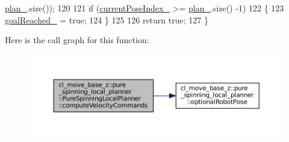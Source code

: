 \begin{DoxyCode}
      \hyperlink{classcl__move__base__z_1_1pure__spinning__local__planner_1_1PureSpinningLocalPlanner_a31875ee78bae4698b579e20c0754860d}{plan\_}.size());
120 
121   \textcolor{keywordflow}{if} (\hyperlink{classcl__move__base__z_1_1pure__spinning__local__planner_1_1PureSpinningLocalPlanner_aa0f9b4cf52a76e44dc2cfc5103d52dcd}{currentPoseIndex\_} >= \hyperlink{classcl__move__base__z_1_1pure__spinning__local__planner_1_1PureSpinningLocalPlanner_a31875ee78bae4698b579e20c0754860d}{plan\_}.size() -1)
122   \{
123     \hyperlink{classcl__move__base__z_1_1pure__spinning__local__planner_1_1PureSpinningLocalPlanner_aecfe0dfc68b8c8e461e8b684e5fa4d2f}{goalReached\_} = \textcolor{keyword}{true};
124   \}
125 
126   \textcolor{keywordflow}{return} \textcolor{keyword}{true};
127 \}
\end{DoxyCode}
Here is the call graph for this function\+:
\nopagebreak
\begin{figure}[H]
\begin{center}
\leavevmode
\includegraphics[width=350pt]{classcl__move__base__z_1_1pure__spinning__local__planner_1_1PureSpinningLocalPlanner_af7dfee89a0a6c54569b5fd262ccbd4f0_cgraph}
\end{center}
\end{figure}
\mbox{\label{classcl__move__base__z_1_1pure__spinning__local__planner_1_1PureSpinningLocalPlanner_afc2d05b55e4a68932bbf8b4aabe9e219}} 
